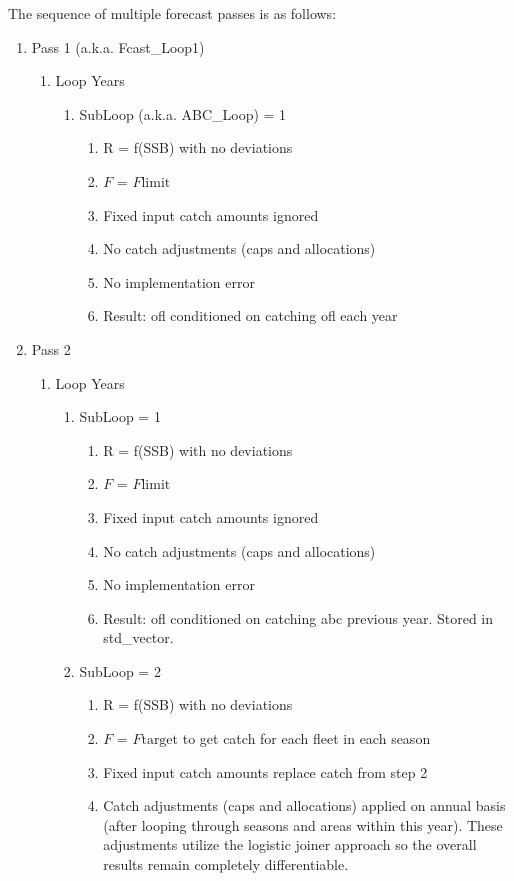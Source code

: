 The sequence of multiple forecast passes is as follows:
\begin{enumerate}
	\item Pass 1 (a.k.a. Fcast\_Loop1)
	\begin{enumerate}
		\item Loop Years
		\begin{enumerate}
			\item SubLoop (a.k.a. ABC\_Loop) = 1
			\begin{enumerate}
				\item R = f(SSB) with no deviations
				\item $F$ = $F\text{limit}$
				\item Fixed input catch amounts ignored
				\item No catch adjustments (caps and allocations)
				\item No implementation error
				\item Result: \gls{ofl} conditioned on catching \gls{ofl} each year
			\end{enumerate}
		\end{enumerate}
	\end{enumerate}
	\item Pass 2
	\begin{enumerate}
		\item Loop Years
		\begin{enumerate}
			\item SubLoop = 1
			\begin{enumerate}
				\item R = f(SSB) with no deviations
				\item $F$ = $F\text{limit}$
				\item Fixed input catch amounts ignored
				\item No catch adjustments (caps and allocations)
				\item No implementation error
				\item Result: \gls{ofl} conditioned on catching \gls{abc} previous year. Stored in std\_vector.
			\end{enumerate}
			\item SubLoop = 2
			\begin{enumerate}
				\item R = f(SSB) with no deviations
				\item $F$ = $F\text{target}$ to get catch for each fleet in each season
				\item Fixed input catch amounts replace catch from step 2
				\item Catch adjustments (caps and allocations) applied on annual basis (after looping through seasons and areas within this year). These adjustments utilize the logistic joiner approach so the overall results remain completely differentiable.

\end{enumerate}
\end{enumerate}
\end{enumerate}
\end{enumerate}
